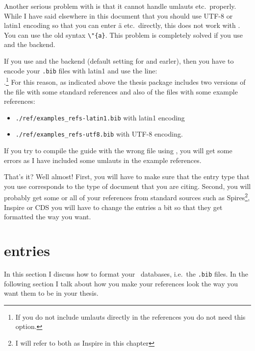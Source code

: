 Another serious problem with \BibTeX{} is that it cannot handle
umlauts etc.\ properly. While I have said elsewhere in this document
that you should use UTF-8 or latin1 encoding so that you can enter ä
etc.\ directly, this does not work with \BibTeX. You can use the
old syntax \verb+\"{a}+. This problem is completely solved if you use
 and the  backend.

If you use  and the  backend (default
setting for  and earler), then you have to encode your \texttt{.bib}
files with latin1 and use the line:\\
.\footnote{%
  If you do not include umlauts directly in the references you do not
  need this option.}
For this reason, as indicated above the thesis package includes two
versions of the file with some standard references and also of the
files with some example references:
\begin{itemize}
\setlength{\parskip}{0pt}\setlength{\itemsep}{0pt}
\item \texttt{./ref/examples\_refs-latin1.bib} with latin1 encoding
\item \texttt{./ref/examples\_refs-utf8.bib} with UTF-8 encoding.
\end{itemize}
If you try to compile the guide with the wrong file using \BibTeX, you
will get some errors as I have included some umlauts in the example
references.

That's it? Well almost! First, you will have to make sure that the
entry type that you use corresponds to the type of document that you
are citing. Second, you will probably get some or all of your
references from standard sources such as Spires\footnote{I
  will refer to both as Inspire in this chapter}, Inspire or CDS you will have
to change the entries a bit so that they get formatted the way you want.


\section{\BibTeX{} entries}
\label{sec:ref:bib}

In this section I discuss how to format your \BibTeX\ databases,
i.e.\ the \texttt{.bib} files. In the following section I talk about
how you make your references look the way you want them to be in your
thesis.

